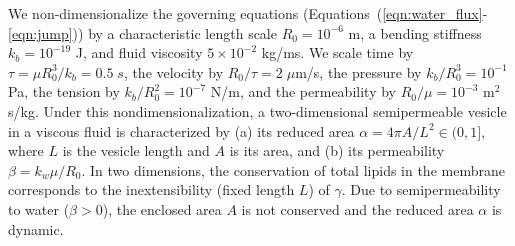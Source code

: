\documentclass[prb,preprint,showpacs,preprintnumbers,amsmath,amssymb,longbibliography]{revtex4-1}
\begin{document}
We non-dimensionalize the governing equations (Equations~(\ref{eqn:water_flux}-\ref{eqn:jump})) by a
characteristic length scale $R_0 = 10^{-6}$ m, a bending stiffness $k_b
= 10^{-19}$ J, and fluid viscosity $5 \times 10^{-2}$ kg/ms. We scale
time by $\tau = \mu R_0^3/k_b = 0.5\;s$, the velocity by $R_0/\tau =
2\;\mu$m/s, the pressure by $k_b/R_0^3 = 10^{-1}$ Pa, the tension by
$k_b/R_0^2 = 10^{-7}$ N/m, and the permeability by $R_0/\mu = 10^{-3}$
m$^2$s/kg. Under this nondimensionalization, a two-dimensional
semipermeable vesicle in a viscous fluid is characterized by (a) its
reduced area $\alpha = 4\pi A/L^2 \in (0,1]$, where $L$ is the vesicle
length and $A$ is its area, and (b) its permeability $\beta = k_w \mu
/R_0$. 
In two dimensions, the conservation of total lipids in the membrane corresponds to the inextensibility (fixed length $L$) of $\gamma$.
Due to semipermeability to water ($\beta>0$),  the enclosed area $A$ is not conserved and the reduced area $\alpha$ is dynamic. 


\end{document}
